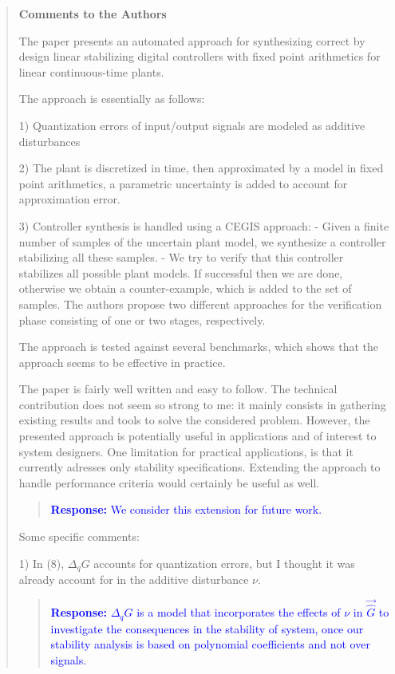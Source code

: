 \documentclass[11pt]{article}
\begin{document}
\begin{quote}

{\bf Comments to the Authors}

The paper presents an automated approach for synthesizing correct by design linear stabilizing digital controllers with fixed point arithmetics for linear continuous-time plants. 

The approach is essentially as follows:

1) Quantization errors of input/output signals are modeled as additive disturbances

2) The plant is discretized in time, then approximated by a model in fixed point arithmetics, a parametric uncertainty is added to account for approximation error.

3) Controller synthesis is handled using a CEGIS approach:
    - Given a finite number of samples of the uncertain plant model, we synthesize a controller stabilizing all these samples. 
    - We try to verify that this controller stabilizes all possible plant models. If successful then we are done, otherwise we obtain a counter-example, which is added to the set of samples. The authors propose two different approaches for the verification phase consisting of one or two stages, respectively.

The approach is tested against several benchmarks, which shows that the approach seems to be effective in practice. 

The paper is fairly well written and easy to follow. The technical contribution does not seem so strong to me: it mainly consists in gathering existing results and tools to solve the considered problem. However, the presented approach is potentially useful in applications and of interest to system designers. One limitation for practical applications, is that it currently adresses only stability specifications. Extending the approach to handle performance criteria would certainly be useful as well. 

\begin{quote}
\textcolor{blue}{\textbf{Response:} 
We consider this extension for future work.}
\end{quote}

Some specific comments:

1) In (8), $\Delta_{q} G$ accounts for quantization errors, but I thought it was already account for in the additive disturbance $\nu$.

\begin{quote}
\textcolor{blue}{\textbf{Response:} $\Delta_{q} G$ is a model that incorporates the effects of $\nu$ in $\vec{\hat{G}}$ to investigate the consequences in the stability of system, once our stability analysis is based on polynomial coefficients and not over signals.}
\end{quote}



\end{quote}
\end{document}
